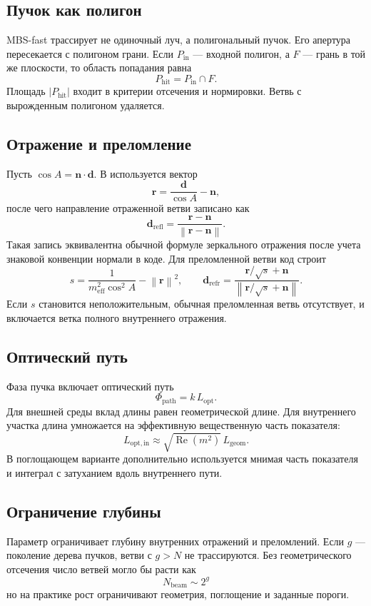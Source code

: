 \documentclass[11pt,a4paper]{article}
\newcommand{\code}[1]{\texttt{\small\detokenize{#1}}}
\newcommand{\vect}[1]{\symbf{#1}}
\newcommand{\Real}{\operatorname{Re}}
\newcommand{\norm}[1]{\left\lVert #1 \right\rVert}
\begin{document}
\subsection{Пучок как полигон}

MBS-fast трассирует не одиночный луч, а полигональный пучок. Его апертура
пересекается с полигоном грани. Если $P_{\mathrm{in}}$ --- входной полигон, а
$F$ --- грань в той же плоскости, то область попадания равна
\[
  P_{\mathrm{hit}} = P_{\mathrm{in}}\cap F.
\]
Площадь $|P_{\mathrm{hit}}|$ входит в критерии отсечения и нормировки. Ветвь с
вырожденным полигоном удаляется.

\subsection{Отражение и преломление}

Пусть $\cos A=\vect n\cdot\vect d$. В \code{Splitting.cpp} используется вектор
\[
  \vect r = \frac{\vect d}{\cos A}-\vect n,
\]
после чего направление отраженной ветви записано как
\[
  \vect d_{\mathrm{refl}}=
  \frac{\vect r-\vect n}{\norm{\vect r-\vect n}}.
\]
Такая запись эквивалентна обычной формуле зеркального отражения после учета знаковой конвенции нормали в коде. Для преломленной ветви код строит
\[
  s =
  \frac{1}{m_{\mathrm{eff}}^2\cos^2 A}-\norm{\vect r}^2,
  \qquad
  \vect d_{\mathrm{refr}}=
  \frac{\vect r/\sqrt{s}+\vect n}
       {\norm{\vect r/\sqrt{s}+\vect n}}.
\]
Если $s$ становится неположительным, обычная преломленная ветвь отсутствует, и включается ветка полного внутреннего отражения.

\subsection{Оптический путь}

Фаза пучка включает оптический путь
\[
  \Phi_{\mathrm{path}} = k\,L_{\mathrm{opt}}.
\]
Для внешней среды вклад длины равен геометрической длине. Для внутреннего участка длина умножается на эффективную вещественную часть показателя:
\[
  L_{\mathrm{opt,in}}\approx \sqrt{\Real(m^2)}\,L_{\mathrm{geom}}.
\]
В поглощающем варианте дополнительно используется мнимая часть показателя и интеграл с затуханием вдоль внутреннего пути.

\subsection{Ограничение глубины}

Параметр \code{--max-reflections N} ограничивает глубину внутренних отражений
и преломлений. Если $g$ --- поколение дерева пучков, ветви с $g>N$ не
трассируются. Без геометрического отсечения число ветвей могло бы расти как
\[
  N_{\mathrm{beam}}\sim 2^g
\]
но на практике рост ограничивают геометрия, поглощение и заданные пороги.
\end{document}
